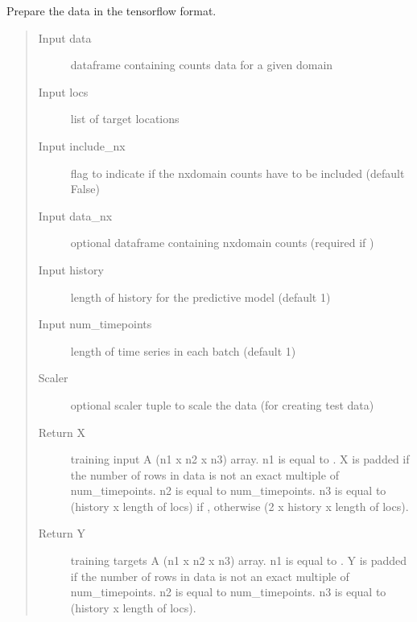 \documentclass[letterpaper,10pt,english]{sphinxmanual}
\begin{document}
\begin{fulllineitems}
\label{\detokenize{manual:dnspredict.prepTFData}}
Prepare the data in the tensorflow format.
\begin{quote}\begin{description}
\item[{Input data}] \leavevmode
dataframe containing counts data for a given domain

\item[{Input locs}] \leavevmode
list of target locations

\item[{Input include\_nx}] \leavevmode
flag to indicate if the nxdomain counts have to be included (default False)

\item[{Input data\_nx}] \leavevmode
optional dataframe containing nxdomain counts (required if )

\item[{Input history}] \leavevmode
length of history for the predictive model (default 1)

\item[{Input num\_timepoints}] \leavevmode
length of time series in each batch (default 1)

\item[{Scaler}] \leavevmode
optional scaler tuple to scale the data (for creating test data)

\item[{Return X}] \leavevmode
training input \sphinxhyphen{} A (n1 x n2 x n3)  array. n1 is equal to . X is padded if the number of rows in data is not an exact multiple of num\_timepoints. n2 is equal to num\_timepoints. n3 is equal to (history x length of locs) if , otherwise (2 x history x length of locs).

\item[{Return Y}] \leavevmode
training targets \sphinxhyphen{} A (n1 x n2 x n3)  array. n1 is equal to . Y is padded if the number of rows in data is not an exact multiple of num\_timepoints. n2 is equal to num\_timepoints. n3 is equal to (history x length of locs).


\end{description}
\end{quote}
\end{fulllineitems}
\end{document}

